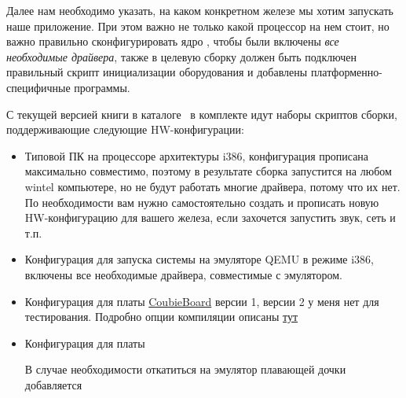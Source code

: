 
Далее нам необходимо указать, на каком конкретном железе мы хотим запускать наше
приложение. При этом важно не только какой процессор на нем стоит, но важно
правильно сконфигурировать ядро \linux, чтобы были включены \emph{все
необходимые драйвера}, также в целевую сборку должен быть подключен правильный
скрипт инициализации оборудования и добавлены платформенно-специфичные
программы.



С текущей версией книги в каталоге \ в комплекте идут наборы
скриптов сборки, поддерживающие следующие HW-конфигурации:

\begin{itemize}
  \item {} Типовой ПК на процессоре архитектуры i386, конфигурация
  прописана максимально совместимо, поэтому в результате сборка запустится на
  любом wintel компьютере, но не будут работать многие драйвера, потому что их
  нет. По необходимости вам нужно самостоятельно создать и прописать новую
  HW-конфигурацию для вашего железа, если захочется запустить звук, сеть и т.п.

  \item {}
  Конфигурация для запуска системы на эмуляторе QEMU в режиме i386, включены
  все необходимые драйвера, совместимые с эмулятором.

  \item {}
  Конфигурация для платы
  \href{http://linux-sunxi.org/Cubietech\_Cubieboard}{CoubieBoard} версии 1,
  версии 2 у меня нет для тестирования.
  Подробно опции компиляции описаны \href{http://habrahabr.ru/post/146877/}{тут}


  \item {}
  Конфигурация для платы \raspi



В случае необходимости откатиться на эмулятор плавающей дочки добавляется


\end{itemize}

